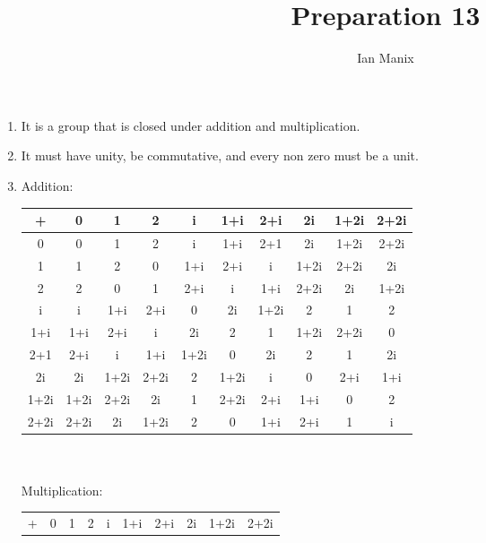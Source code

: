 \documentclass[sigconf]{article}
\title{
  \textbf{Preparation 13} \\
  }
\author{ 
  Ian Manix
  }
\begin{document}



\maketitle





\begin{enumerate}
  \item It is a group that is closed under addition and multiplication.
  \item It must have unity, be commutative, and every non zero must be a unit.
  \item Addition: \\
    \begin{tabular}{c | ccccccccc}
      +    & 0 & 1 & 2 & i & 1+i & 2+i & 2i & 1+2i & 2+2i \\
      \hline
      0    & 0    & 1    & 2    & i    & 1+i  & 2+1  & 2i   & 1+2i & 2+2i \\
      1    & 1    & 2    & 0    & 1+i  & 2+i  & i    & 1+2i & 2+2i & 2i \\
      2    & 2    & 0    & 1    & 2+i  & i    & 1+i  & 2+2i & 2i   & 1+2i \\
      i    & i    & 1+i  & 2+i  & 0    & 2i   & 1+2i & 2    & 1    & 2 \\
      1+i  & 1+i  & 2+i  & i    & 2i   & 2    & 1    & 1+2i & 2+2i & 0 \\
      2+1  & 2+i  & i    & 1+i  & 1+2i & 0    & 2i   & 2    & 1    & 2i \\
      2i   & 2i   & 1+2i & 2+2i & 2    & 1+2i & i    & 0    & 2+i  & 1+i \\
      1+2i & 1+2i & 2+2i & 2i   & 1    & 2+2i & 2+i  & 1+i  & 0    & 2 \\
      2+2i & 2+2i & 2i   & 1+2i & 2    & 0    & 1+i  & 2+i  & 1    & i \\
    \end{tabular}\\ \\
    Multiplication:\\
    \begin{tabular}{c | ccccccccc}
      + & 0 & 1 & 2 & i & 1+i & 2+i & 2i & 1+2i & 2+2i \\

\end{tabular}
\end{enumerate}
\end{document}
